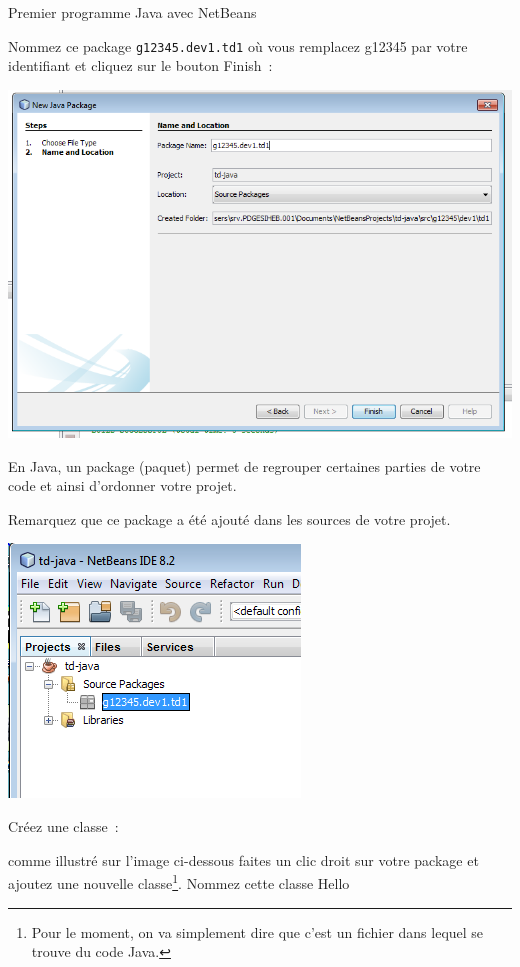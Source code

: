 \documentclass[a4paper,11pt]{style-esi/td}
\begin{document}
\begin{Tutoriel}{Premier programme Java avec NetBeans}
\begin{steps}
		Nommez ce package \texttt{g12345.dev1.td1} où vous remplacez g12345 par votre identifiant et cliquez sur le bouton \og Finish\fg~:

		\bigskip
		\begin{center}
			\includegraphics[width=.9\textwidth]{images/nb_newproject_package2}
		\end{center}

		En Java, un package (paquet) permet de regrouper certaines parties de votre code
		et ainsi d'ordonner votre projet.

		Remarquez que ce package a été ajouté dans les sources de votre projet.
		\bigskip
		\begin{center}
			\includegraphics{images/nb_newproject_package3}
		\end{center}



		\item Créez une classe~:

		comme illustré sur l'image ci-dessous faites un clic droit sur votre package
		et ajoutez une nouvelle classe\footnote{Pour le moment,
			on va simplement dire que c'est un fichier dans lequel se trouve du code Java.}.
		Nommez cette classe {Hello}


\end{steps}
\end{Tutoriel}
\end{document}
